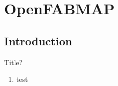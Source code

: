\section{OpenFABMAP}

\subsection{Introduction}
\begin{frame}{Title?}
   \begin{enumerate}
       \item test
   \end{enumerate} 
\end{frame}
